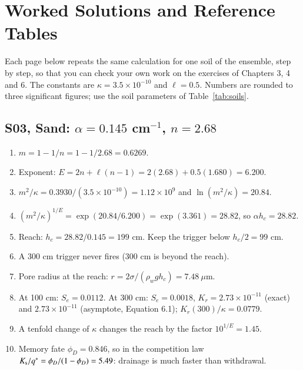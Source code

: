 \chapter{Worked Solutions and Reference Tables}\label{chap:18}
Each page below repeats the same calculation for one soil of the ensemble, step by step, so that you can check your own work on the exercises of Chapters 3, 4 and 6. The constants are $\kappa=3.5\times10^{-10}$ and $\ell=0.5$. Numbers are rounded to three significant figures; use the soil parameters of Table~\ref{tab:soils}.
\section{S03, Sand: $\alpha=0.145$ cm$^{-1}$, $n=2.68$}
\begin{enumerate}[leftmargin=*,itemsep=1pt]
\item $m=1-1/n=1-1/2.68=0.6269$.
\item Exponent: $E=2n+\ell(n-1)=2(2.68)+0.5(1.680)=6.200$.
\item $m^2/\kappa=0.3930/(3.5\times10^{-10})=1.12\times10^{9}$ and $\ln(m^2/\kappa)=20.84$.
\item $(m^2/\kappa)^{1/E}=\exp(20.84/6.200)=\exp(3.361)=28.82$, so $\alpha h_c=28.82$.
\item Reach: $h_c=28.82/0.145=199$ cm. Keep the trigger below $h_c/2=99$ cm.
\item A 300 cm trigger never fires (300 cm is beyond the reach).
\item Pore radius at the reach: $r=2\sigma/(\rho_wgh_c)=7.48\ \mu$m.
\item At 100 cm: $S_e=0.0112$. At 300 cm: $S_e=0.0018$, $K_r=2.73\times10^{-11}$ (exact) and $2.73\times10^{-11}$ (asymptote, Equation 6.1); $K_r(300)/\kappa=0.0779$.
\item A tenfold change of $\kappa$ changes the reach by the factor $10^{1/E}=1.45$.
\item Memory fate $\phi_D=0.846$, so in the competition law $K_{\mathrm s}/q^*=\phi_D/(1-\phi_D)=5.49$: drainage is much faster than withdrawal.
\end{enumerate}

